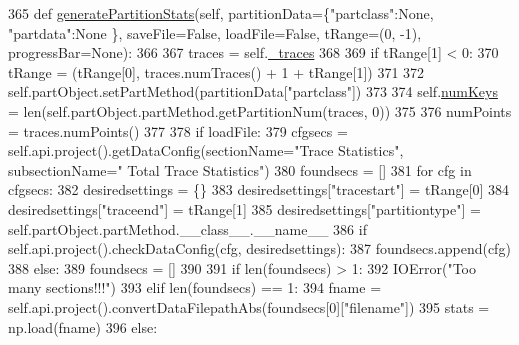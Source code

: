 \begin{DoxyCode}
365     \textcolor{keyword}{def }\hyperlink{classsoftware_1_1chipwhisperer_1_1analyzer_1_1utils_1_1TraceExplorerScripts_1_1PartitionDisplay_1_1PartitionDisplay_ae395e71544b50ad7b8bb9fb9f6a15beb}{generatePartitionStats}(self, partitionData=\{"partclass":None, \textcolor{stringliteral}{"partdata"}:\textcolor{keywordtype}{None}
      \}, saveFile=\textcolor{keyword}{False}, loadFile=\textcolor{keyword}{False},  tRange=(0, -1), progressBar=\textcolor{keywordtype}{None}):
366 
367         traces = self.\hyperlink{classsoftware_1_1chipwhisperer_1_1analyzer_1_1utils_1_1TraceExplorerScripts_1_1PartitionDisplay_1_1PartitionDisplay_a62522467fca010c0a3bcfaf24adf2a99}{\_traces}
368 
369         \textcolor{keywordflow}{if} tRange[1] < 0:
370             tRange = (tRange[0], traces.numTraces() + 1 + tRange[1])
371 
372         self.partObject.setPartMethod(partitionData[\textcolor{stringliteral}{"partclass"}])
373 
374         self.\hyperlink{classsoftware_1_1chipwhisperer_1_1analyzer_1_1utils_1_1TraceExplorerScripts_1_1PartitionDisplay_1_1PartitionDisplay_a9609f827035095f248787dbde121fa08}{numKeys} = len(self.partObject.partMethod.getPartitionNum(traces, 0))
375 
376         numPoints = traces.numPoints()
377 
378         \textcolor{keywordflow}{if} loadFile:
379             cfgsecs = self.api.project().getDataConfig(sectionName=\textcolor{stringliteral}{"Trace Statistics"}, subsectionName=\textcolor{stringliteral}{"
      Total Trace Statistics"})
380             foundsecs = []
381             \textcolor{keywordflow}{for} cfg \textcolor{keywordflow}{in} cfgsecs:
382                 desiredsettings = \{\}
383                 desiredsettings[\textcolor{stringliteral}{"tracestart"}] = tRange[0]
384                 desiredsettings[\textcolor{stringliteral}{"traceend"}] = tRange[1]
385                 desiredsettings[\textcolor{stringliteral}{"partitiontype"}] = self.partObject.partMethod.\_\_class\_\_.\_\_name\_\_
386                 \textcolor{keywordflow}{if} self.api.project().checkDataConfig(cfg, desiredsettings):
387                     foundsecs.append(cfg)
388         \textcolor{keywordflow}{else}:
389             foundsecs = []
390 
391         \textcolor{keywordflow}{if} len(foundsecs) > 1:
392             IOError(\textcolor{stringliteral}{"Too many sections!!!"})
393         \textcolor{keywordflow}{elif} len(foundsecs) == 1:
394             fname = self.api.project().convertDataFilepathAbs(foundsecs[0][\textcolor{stringliteral}{"filename"}])
395             stats = np.load(fname)
396         \textcolor{keywordflow}{else}:

\end{DoxyCode}
